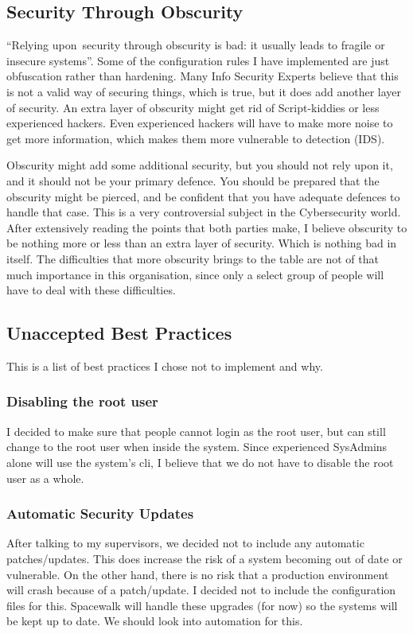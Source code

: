\subsection{Security Through Obscurity}
“Relying upon security through obscurity is bad: it usually leads to fragile or insecure systems”.
Some of the configuration rules I have implemented are just obfuscation rather than hardening. Many Info Security Experts believe that this is not a valid way of securing things, which is true, but it does add another layer of security. An extra layer of obscurity might get rid of Script-kiddies or less experienced hackers. Even experienced hackers will have to make more noise to get more information, which makes them more vulnerable to detection (IDS). 

Obscurity might add some additional security, but you should not rely upon it, and it should not be your primary defence. You should be prepared that the obscurity might be pierced, and be confident that you have adequate defences to handle that case.
This is a very controversial subject in the Cybersecurity world. After extensively reading the points that both parties make, I believe obscurity to be nothing more or less than an extra layer of security. Which is nothing bad in itself. The difficulties that more obscurity brings to the table are not of that much importance in this organisation, since only a select group of people will have to deal with these difficulties. 


\subsection{Unaccepted Best Practices}
This is a list of best practices I chose not to implement and why. 
\subsubsection{Disabling the root user}
I decided to make sure that people cannot login as the root user, but can still change to the root user when inside the system. Since experienced SysAdmins alone will use the system’s cli, I believe that we do not have to disable the root user as a whole. 

\subsubsection{Automatic  Security Updates}
After talking to my supervisors, we decided not to include any automatic patches/updates. This does increase the risk of a system becoming out of date or vulnerable. On the other hand, there is no risk that a production environment will crash because of a patch/update. I decided not to include the configuration files for this. Spacewalk will handle these upgrades (for now) so the systems will be kept up to date. We should look into automation for this. 